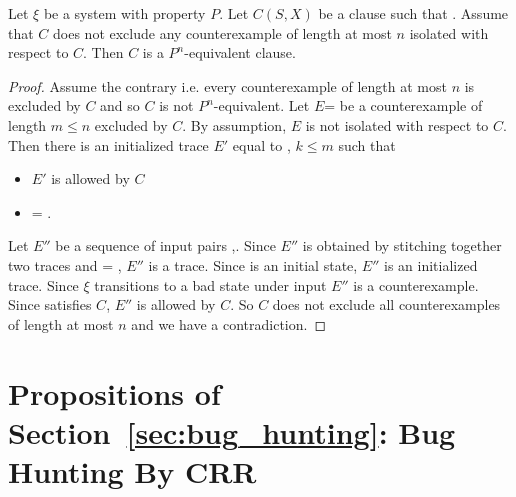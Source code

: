 \begin{proposition}
Let $\xi$ be a system with property $P$. Let $C(S,X)$ be a clause such
that . Assume that $C$ does not exclude any
counterexample of length at most $n$ isolated with respect to $C$.
Then $C$ is a $P^n$-equivalent clause.
\end{proposition}
\begin{proof}
Assume the contrary i.e. every counterexample of length at most $n$ is
excluded by $C$ and so $C$ is not $P^n$-equivalent. Let
$E$= be a counterexample of length $m \leq n$ excluded
by $C$.  By assumption, $E$ is not isolated with respect to $C$. Then
there is an initialized trace $E'$ equal to , $k \leq
m$ such that
\begin{itemize}
\item $E'$ is allowed by $C$
\item {} = .
\end{itemize}
Let $E''$ be a sequence of input pairs
,. Since $E''$ is obtained by
stitching together two traces and  = , $E''$ is a
trace.  Since  is an initial state, $E''$ is an initialized
trace. Since $\xi$ transitions to a bad state under
input  $E''$ is a counterexample.  Since 
satisfies $C$, $E''$ is allowed by $C$.  So $C$ does not exclude all
counterexamples of length at most $n$ and we have a contradiction.
\end{proof}

\section*{Propositions of Section~\ref{sec:bug_hunting}: Bug Hunting By CRR}


